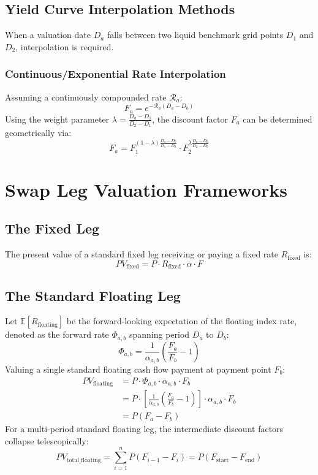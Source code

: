 \documentclass{article}
\begin{document}
\subsection{Yield Curve Interpolation Methods}
When a valuation date $D_a$ falls between two liquid benchmark grid points $D_1$ and $D_2$, interpolation is required. 

\subsubsection{Continuous/Exponential Rate Interpolation}
Assuming a continuously compounded rate $\mathcal{R}_a$:
\begin{equation}
    F_a = e^{-\mathcal{R}_a(D_a - D_0)}
\end{equation}
Using the weight parameter $\lambda = \frac{D_a - D_1}{D_2 - D_1}$, the discount factor $F_a$ can be determined geometrically via:
\begin{equation}
    F_a = F_1^{(1-\lambda)\frac{D_a-D_0}{D_1-D_0}} \cdot F_2^{\lambda\frac{D_a-D_0}{D_2-D_0}}
\end{equation}


\section{Swap Leg Valuation Frameworks}

\subsection{The Fixed Leg}
The present value of a standard fixed leg receiving or paying a fixed rate $R_{\text{fixed}}$ is:
\begin{equation}
    PV_{\text{fixed}} = P \cdot R_{\text{fixed}} \cdot \alpha \cdot F
\end{equation}

\subsection{The Standard Floating Leg}
Let $\mathbb{E}[R_{\text{floating}}]$ be the forward-looking expectation of the floating index rate, denoted as the forward rate $\Phi_{a,b}$ spanning period $D_a$ to $D_b$:
\begin{equation}
    \Phi_{a,b} = \frac{1}{\alpha_{a,b}} \left( \frac{F_a}{F_b} - 1 \right)
\end{equation}
Valuing a single standard floating cash flow payment at payment point $F_b$:
\begin{align}
    PV_{\text{floating}} &= P \cdot \Phi_{a,b} \cdot \alpha_{a,b} \cdot F_b \nonumber \\
    &= P \cdot \left[ \frac{1}{\alpha_{a,b}} \left( \frac{F_a}{F_b} - 1 \right) \right] \cdot \alpha_{a,b} \cdot F_b \nonumber \\
    &= P(F_a - F_b)
\end{align}
For a multi-period standard floating leg, the intermediate discount factors collapse telescopically:
\begin{equation}
    PV_{\text{total\_floating}} = \sum_{i=1}^n P(F_{i-1} - F_i) = P(F_{\text{start}} - F_{\text{end}})
\end{equation}
\end{document}
